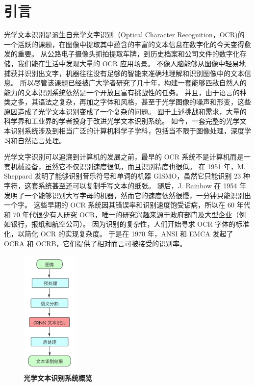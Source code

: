 
\chapter{引言}
\label{chap:introduction}
光学文本识别是派生自光学文字识别（Optical Character Recognition，OCR)的一个活跃的课题，在图像中提取其中蕴含的丰富的文本信息在数字化的今天变得愈发的重要。
从公路电子摄像头抓拍提取车牌，到历史档案和公司文件的数字化存储，我们能在生活中发现大量的 OCR 应用场景。
不像人脑能够从图像中轻易地捕获并识别出文字，机器往往没有足够的智能来准确地理解和识别图像中的文本信息。
所以尽管该课题已经被广大学者研究了几十年，构建一套能够匹敌自然人的能力的文本识别系统依然是一个开放且富有挑战性的任务。
并且，由于语言的种类之多，其语法之复杂，再加之字体和风格，甚至于光学图像的噪声和形变，这些原因造成了光学文本识别变成了一个复杂的问题。
囿于上述挑战和需求，大量的科学界和工业界的学者投身于改进光学文本识别系统。
如今，一套完整的光学文本识别系统涉及到相当广泛的计算机科学子学科，包括当不限于图像处理，深度学习和自然语言处理。

光学文字识别可以追溯到计算机的发展之前，最早的 OCR 系统不是计算机而是一套机械设备，虽然它不仅识别速度很低，而且识别精度也很低。
在 1951 年，M. Sheppard 发明了能够识别音乐符号和单词的机器 GISMO，虽然它只能识别 23 种字符，这套系统甚至还可以复制手写文本的纸张。
随后，J. Rainbow 在 1954 年发明了一个能够识别大写字母的机器，然而它的速度依然很慢，一分钟只能识别出一个字。
这些早期的 OCR 系统因其错误率和识别速度饱受诟病，所以在 60 年代和 70 年代很少有人研究 OCR，唯一的研究兴趣来源于政府部门及大型企业（例如银行，报纸和航空公司）。
因为识别的复杂性，人们开始寻求 OCR 字体的标准化，以简化 OCR 的实现复杂度。
于是在 1970 年，ANSI 和 EMCA 发起了 OCRA 和 OCRB，它们提供了相对而言可被接受的识别率。

\begin{figure}[h!]
	\centering
	\includegraphics[width=0.25\textwidth]{figure/resources/OCR_system.png}
	\caption{\textbf{光学文本识别系统概览}\label{ocr_system_overall}}
\end{figure}


